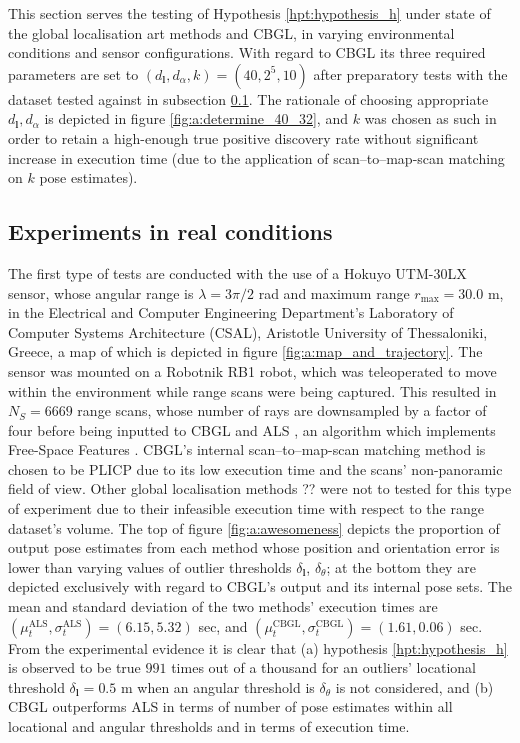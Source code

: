 This section serves the testing of Hypothesis \ref{hpt:hypothesis_h} under
state of the global localisation art methods and CBGL, in varying environmental
conditions and sensor configurations. With regard to CBGL its three required
parameters are set to $(d_{\bm{l}},d_{\alpha},k) = (40, 2^5, 10)$ after
preparatory tests with the dataset tested against in subsection
\ref{subsec:exp_in_re_co}. The rationale of choosing appropriate
$d_{\bm{l}},d_{\alpha}$ is depicted in figure \ref{fig:a:determine_40_32}, and
$k$ was chosen as such in order to retain a high-enough true positive discovery
rate without significant increase in execution time (due to the application of
scan--to--map-scan matching on $k$ pose estimates).


\subsection{Experiments in real conditions}
\label{subsec:exp_in_re_co}

The first type of tests are conducted with the use of a Hokuyo UTM-30LX
sensor, whose angular range is $\lambda = 3\pi/2$ rad and maximum range
$r_{\max} = 30.0$ m, in the  Electrical and Computer Engineering Department's
Laboratory of Computer Systems Architecture (CSAL), Aristotle University of
Thessaloniki, Greece, a map of which is depicted in figure
\ref{fig:a:map_and_trajectory}. The sensor was mounted on a Robotnik RB1 robot,
which was teleoperated to move within the environment while range scans were
being captured. This resulted in $N_{S}=6669$ range scans, whose number of rays
are downsampled by a factor of four before being inputted to CBGL and ALS
\cite{als_jp}, an algorithm which implements Free-Space Features
\cite{als_eth}. CBGL's internal scan--to--map-scan matching method is chosen
to be PLICP \cite{Censi2008c} due to its low execution time and the scans'
non-panoramic field of view.  Other global localisation methods ?? were not to
tested for this type of experiment due to their infeasible execution time with
respect to the range dataset's volume. The top of figure \ref{fig:a:awesomeness}
depicts the proportion of output pose estimates from each method whose position
and orientation error is lower than varying values of outlier thresholds
$\delta_{\bm{l}}$, $\delta_{\theta}$; at the bottom they are depicted
exclusively with regard to CBGL's output and its internal pose sets. The mean
and standard deviation of the two methods' execution times are
$(\mu_t^{\text{ALS}}, \sigma_t^{\text{ALS}}) = (6.15, 5.32)$ sec,
and $(\mu_t^{\text{CBGL}}, \sigma_t^{\text{CBGL}}) = (1.61, 0.06)$
sec. From the experimental evidence it is clear that (a) hypothesis
\ref{hpt:hypothesis_h} is observed to be true $991$ times out of a thousand for
an outliers' locational threshold $\delta_{\bm{l}} = 0.5$ m when an angular
threshold is $\delta_{\theta}$ is not considered, and (b) CBGL outperforms ALS
in terms of number of pose estimates within all locational and angular
thresholds and in terms of execution time.

